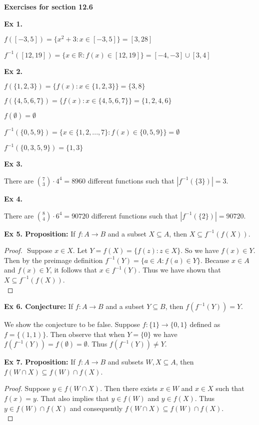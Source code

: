 \documentclass{article}
\date{}
\author{}
\begin{document}
\centerline{\textbf{Exercises for section 12.6}}

\textbf{Ex 1.}

$f([-3,5]) = \{x^2+3 : x \in [-3,5] \}=[3, 28]$

$f^{-1}([12, 19])= \{ x \in \mathbb{R} : f(x) \in [12,19] \} = [-4, -3] \cup [3, 4]$

\textbf{Ex 2.}

$f(\{1,2,3\})= \{ f(x) : x \in \{1,2,3\}\} = \{3, 8\}$

$f(\{4,5,6,7\})=\{f(x) : x \in \{4,5,6,7\}\} = \{1,2,4,6\}$

$f(\emptyset)= \emptyset$

$f^{-1}(\{0,5,9\})= \{x \in \{1,2,...,7\} : f(x) \in \{0,5,9\}\} = \emptyset$

$f^{-1}(\{0,3,5,9\})=\{1,3\}$

\textbf{Ex 3.}

There are ${7 \choose 3} \cdot{} 4^4 = 8960$ different functions such that $|f^{-1}(\{3\})|=3$.

\textbf{Ex 4.}

There are ${8 \choose 4} \cdot{} 6^4 = 90720$ different functions such that $|f^{-1}(\{2\})|=90720$.

\textbf{Ex 5. Proposition:} If $f : A \rightarrow B$ and a subset $X \subseteq A$, then $X \subseteq f^{-1}(f(X))$.
\begin{proof}
$ $\newline
Suppose $x \in X$. Let $Y=f(X)= \{ f(z) :z \in X \}$. So we have $f(x) \in Y$. Then by the preimage definition $f^{-1}(Y)= \{a \in A: f(a) \in Y\}$. Because $x \in A$ and $f(x) \in Y$, it follows that $x \in f^{-1}(Y)$. Thus we have shown that $X \subseteq f^{-1}(f(X))$.\\
\end{proof}
\textbf{Ex 6. Conjecture:} If $f: A \rightarrow B$ and a subset $Y \subseteq B$, then $f(f^{-1}(Y))=Y$.

We show the conjecture to be false. Suppose $f : \{1\} \rightarrow \{0,1\}$ defined as $f=\{(1,1)\}$. Then observe that when $Y=\{0\}$ we have $f(f^{-1}(Y))=f(\emptyset)=\emptyset$. Thus $f(f^{-1}(Y)) \neq Y$.

\textbf{Ex 7. Proposition:} If $f : A \rightarrow B$ and subsets $W,X \subseteq A$, then $f(W \cap X) \subseteq f(W) \cap f(X)$.
\begin{proof}
Suppose $y \in f(W \cap X)$. Then there exists $x \in W$ and $x \in X$ such that $f(x) = y$. That also implies that $y \in f(W)$ and $y \in f(X)$. Thus $y \in f(W) \cap f(X)$ and consequently $f(W \cap X) \subseteq f(W) \cap f(X)$.\\
\end{proof}
\end{document}

